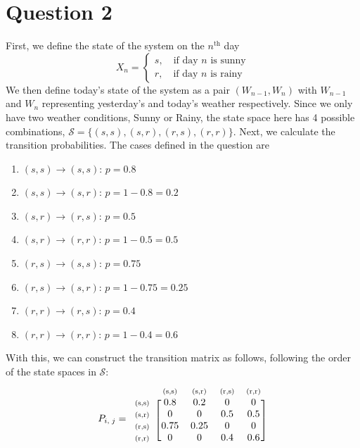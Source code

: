 \documentclass[12pt]{article}
\newcommand{\matindex}[1]{\mbox{\scriptsize#1}}%
\begin{document}
\section*{Question 2}

First, we define the state of the system on the $n^{\text{th}}$ day \begin{equation}
    X_n = \begin{cases}
        s, \quad \text{if day } n \text{ is sunny}\\
        r, \quad \text{if day } n \text{ is rainy}
    \end{cases}
\end{equation} We then define today's state of the system as a pair $(W_{n-1}, W_n)$ with $W_{n-1}$ and $W_n$ representing yesterday's and today's weather respectively. Since we only have two weather conditions, Sunny or Rainy, the state space here has 4 possible combinations, $\mathcal{S} = \{(s,s), (s,r), (r,s), (r,r)\}$. Next, we calculate the transition probabilities. The cases defined in the question are \begin{enumerate}
    \item $(s,s) \to (s,s)$: $p = 0.8$
    \item $(s,s) \to (s,r)$: $p = 1 - 0.8 = 0.2$
    \item $(s,r) \to (r,s)$: $p = 0.5$
    \item $(s,r) \to (r,r)$: $p = 1- 0.5 = 0.5$
    \item $(r,s) \to (s,s)$: $p = 0.75$
    \item $(r,s) \to (s,r)$: $p = 1-0.75 = 0.25$
    \item $(r,r) \to (r,s)$: $p = 0.4$
    \item $(r,r) \to (r,r)$: $p = 1-0.4=0.6$
\end{enumerate} With this, we can construct the transition matrix as follows, following the order of the state spaces in $\mathcal{S}$: \begin{equation}
        P_{i, \; j} = \begin{blockarray}{ccccc}
                & \matindex{(s,s)} &\matindex{(s,r)} &\matindex{(r,s)} &\matindex{(r,r)} \\ 
            \begin{block}{c[cccc]}
                \matindex{(s,s)} & 0.8 & 0.2 & 0 & 0 \\ 
                \matindex{(s,r)} & 0 & 0 & 0.5 & 0.5 \\ 
                \matindex{(r,s)} & 0.75 & 0.25 & 0 & 0 \\ 
                \matindex{(r,r)} & 0 & 0 & 0.4 & 0.6 \\ 
            \end{block}
        \end{blockarray}
\end{equation}
\end{document}
